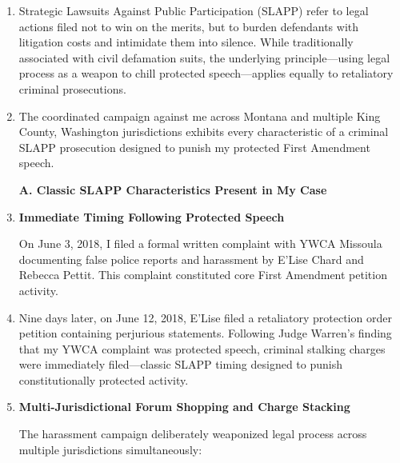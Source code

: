 \documentclass[12pt,letterpaper]{article}
\begin{document}
\begin{enumerate}

\item Strategic Lawsuits Against Public Participation (SLAPP) refer to legal actions filed not to win on the merits, but to burden defendants with litigation costs and intimidate them into silence. While traditionally associated with civil defamation suits, the underlying principle---using legal process as a weapon to chill protected speech---applies equally to retaliatory criminal prosecutions.

\item The coordinated campaign against me across Montana and multiple King County, Washington jurisdictions exhibits every characteristic of a criminal SLAPP prosecution designed to punish my protected First Amendment speech.

\textbf{A. Classic SLAPP Characteristics Present in My Case}

\item \textbf{Immediate Timing Following Protected Speech}

On June 3, 2018, I filed a formal written complaint with YWCA Missoula documenting false police reports and harassment by E'Lise Chard and Rebecca Pettit. This complaint constituted core First Amendment petition activity.

\item Nine days later, on June 12, 2018, E'Lise filed a retaliatory protection order petition containing perjurious statements. Following Judge Warren's finding that my YWCA complaint was protected speech, criminal stalking charges were immediately filed---classic SLAPP timing designed to punish constitutionally protected activity.

\item \textbf{Multi-Jurisdictional Forum Shopping and Charge Stacking}

The harassment campaign deliberately weaponized legal process across multiple jurisdictions simultaneously:


\end{enumerate}
\end{document}
